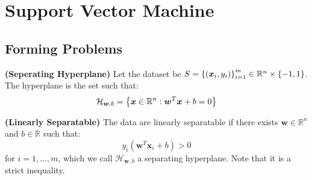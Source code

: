 \section{Support Vector Machine}

\subsection{Forming Problems}

\begin{definition}{\textbf{(Seperating Hyperplane)}}
    Let the dataset be $S = \left\{ (\boldsymbol x_i, y_i) \right\}^m_{i=1} \in \mathbb{R}^n \times \left\{ -1, 1 \right\}$. The hyperplane is the set such that:
    \begin{equation*}
        \mathcal{H}_{\boldsymbol w, b} = \left\{ \boldsymbol x\in \mathbb{R}^n : \boldsymbol w^T\boldsymbol x + b = 0 \right\}
    \end{equation*}
\end{definition}

\begin{definition}{\textbf{(Linearly Separatable)}}
    The data are linearly separatable if there exists $\boldsymbol w \in \mathbb{R}^n$ and $b\in \mathbb{R}$ such that:
    \begin{equation*}
        y_i(\boldsymbol w^T\boldsymbol x_i + b) > 0
    \end{equation*}
    for $i=1,\dots,m$, which we call $\mathcal{H}_{\boldsymbol w, b}$ a separating hyperplane. Note that it is a strict inequality. 
\end{definition}


